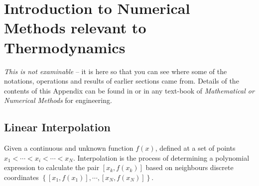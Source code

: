 
\chapter{Introduction to Numerical Methods relevant to Thermodynamics}\label{Appendix_NumMethods}


\localtableofcontents

{\it This is not examinable} -- it is here so that you can see where some of the notations, operations and results of earlier sections came from. Details of the contents of this Appendix can be found in \cite{Atkinson_Book_Newton,Atkinson_Book_Interpolation,NumericalRecipes_Interpolation,NumericalRecipes_Newton} or in any text-book of {\it Mathematical or Numerical Methods} for engineering.

\section{Linear Interpolation}\label{LinearInterpolation}

Given a continuous and unknown function $f(x)$, defined at a set of points  $x_{1} < \cdots < x_{i} < \cdots < x_{N}$. Interpolation is the process of determining a polynomial expression to calculate the pair $\left[x_{k}, f\left(x_{k}\right)\right]$ based on neighbours discrete coordinates $\left\{\left[x_{1},f\left(x_{1}\right)\right], \cdots, \left[x_{N},f\left(x_{N}\right)\right]\right\}$. 

